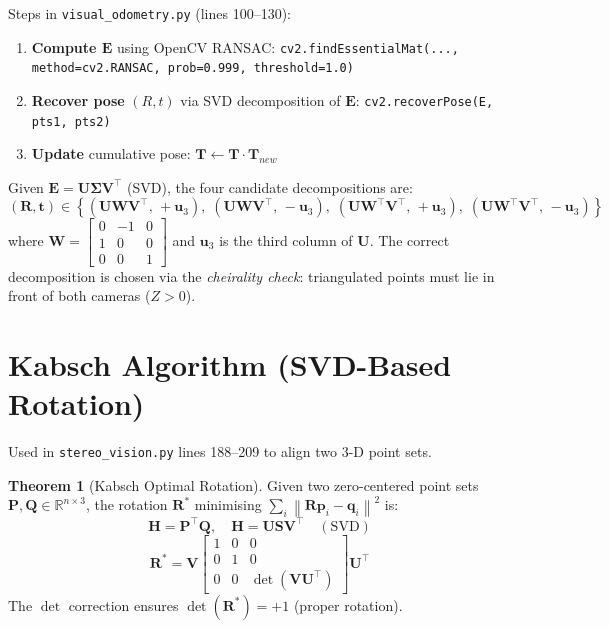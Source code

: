 \documentclass[12pt,a4paper,twoside]{report}
\theoremstyle{definition}
\newtheorem{theorem}{Theorem}[chapter]
\newcommand{\vect}[1]{\bm{#1}}
\newcommand{\mat}[1]{\mathbf{#1}}
\newcommand{\R}{\mathbb{R}}
\newcommand{\norm}[1]{\left\lVert #1 \right\rVert}
\newcommand{\T}{\top}           %
\newcommand{\code}[1]{\texttt{#1}}
\newcommand{\file}[1]{\texttt{\textcolor{codeblue}{#1}}}
\begin{document}
\noindent Steps in \file{visual\_odometry.py} (lines 100--130):
\begin{enumerate}
  \item \textbf{Compute $\mat{E}$} using OpenCV RANSAC:
        \code{cv2.findEssentialMat(..., method=cv2.RANSAC, prob=0.999, threshold=1.0)}
  \item \textbf{Recover pose} $(R,t)$ via SVD decomposition of $\mat{E}$:
        \code{cv2.recoverPose(E, pts1, pts2)}
  \item \textbf{Update} cumulative pose: $\mat{T} \leftarrow \mat{T} \cdot \mat{T}_{new}$
\end{enumerate}

\begin{mathbox}
Given $\mat{E} = \mat{U}\mat{\Sigma}\mat{V}^\T$ (SVD), the four candidate
decompositions are:
\[
  (\mat{R}, \vect{t}) \in \left\{
    (\mat{U}\mat{W}\mat{V}^\T,\, +\vect{u}_3),\;
    (\mat{U}\mat{W}\mat{V}^\T,\, -\vect{u}_3),\;
    (\mat{U}\mat{W}^\T\mat{V}^\T,\, +\vect{u}_3),\;
    (\mat{U}\mat{W}^\T\mat{V}^\T,\, -\vect{u}_3)
  \right\}
\]
where $\mat{W}=\begin{bmatrix}0&-1&0\\1&0&0\\0&0&1\end{bmatrix}$ and
$\vect{u}_3$ is the third column of $\mat{U}$.
The correct decomposition is chosen via the \emph{cheirality check}:
triangulated points must lie in front of both cameras ($Z>0$).
\end{mathbox}

\section{Kabsch Algorithm (SVD-Based Rotation)}

Used in \file{stereo\_vision.py} lines 188--209 to align two 3-D point sets.

\begin{theorem}[Kabsch Optimal Rotation]
Given two zero-centered point sets $\mat{P}, \mat{Q} \in \R^{n\times3}$, the
rotation $\mat{R}^*$ minimising $\sum_i \norm{\mat{R}\vect{p}_i - \vect{q}_i}^2$ is:
\[
  \mat{H} = \mat{P}^\T \mat{Q}, \quad \mat{H} = \mat{U}\mat{S}\mat{V}^\T \quad(\text{SVD})
\]
\[
  \mat{R}^* = \mat{V} \begin{bmatrix} 1 & 0 & 0 \\ 0 & 1 & 0 \\ 0 & 0 & \det(\mat{V}\mat{U}^\T) \end{bmatrix} \mat{U}^\T
\]
The $\det$ correction ensures $\det(\mat{R}^*)=+1$ (proper rotation).
\end{theorem}
\end{document}
